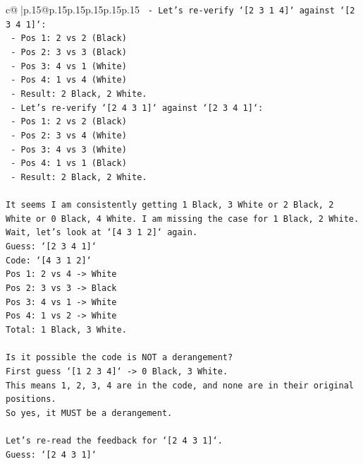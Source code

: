 \documentclass{article}
\begin{document}
{\begin{supertabular}{c@{$\;$}|p{.15\linewidth}@{}p{.15\linewidth}p{.15\linewidth}p{.15\linewidth}p{.15\linewidth}p{.15\linewidth}}
{{{\texttt{  {-} Let's re{-}verify `{[}2 3 1 4{]}` against `{[}2 3 4 1{]}`:} \\
\texttt{    {-} Pos 1: 2 vs 2 (Black)} \\
\texttt{    {-} Pos 2: 3 vs 3 (Black)} \\
\texttt{    {-} Pos 3: 4 vs 1 (White)} \\
\texttt{    {-} Pos 4: 1 vs 4 (White)} \\
\texttt{    {-} Result: 2 Black, 2 White.} \\
\texttt{  {-} Let's re{-}verify `{[}2 4 3 1{]}` against `{[}2 3 4 1{]}`:} \\
\texttt{    {-} Pos 1: 2 vs 2 (Black)} \\
\texttt{    {-} Pos 2: 3 vs 4 (White)} \\
\texttt{    {-} Pos 3: 4 vs 3 (White)} \\
\texttt{    {-} Pos 4: 1 vs 1 (Black)} \\
\texttt{    {-} Result: 2 Black, 2 White.} \\
\\ 
\texttt{It seems I am consistently getting 1 Black, 3 White or 2 Black, 2 White or 0 Black, 4 White. I am missing the case for 1 Black, 2 White.} \\
\texttt{Wait, let's look at `{[}4 3 1 2{]}` again.} \\
\texttt{Guess: `{[}2 3 4 1{]}`} \\
\texttt{Code: `{[}4 3 1 2{]}`} \\
\texttt{Pos 1: 2 vs 4 {-}> White} \\
\texttt{Pos 2: 3 vs 3 {-}> Black} \\
\texttt{Pos 3: 4 vs 1 {-}> White} \\
\texttt{Pos 4: 1 vs 2 {-}> White} \\
\texttt{Total: 1 Black, 3 White.} \\
\\ 
\texttt{Is it possible the code is NOT a derangement?} \\
\texttt{First guess `{[}1 2 3 4{]}` {-}> 0 Black, 3 White.} \\
\texttt{This means 1, 2, 3, 4 are in the code, and none are in their original positions.} \\
\texttt{So yes, it MUST be a derangement.} \\
\\ 
\texttt{Let's re{-}read the feedback for `{[}2 4 3 1{]}`.} \\
\texttt{Guess: `{[}2 4 3 1{]}`} \\
}}}
\end{supertabular}}
\end{document}
